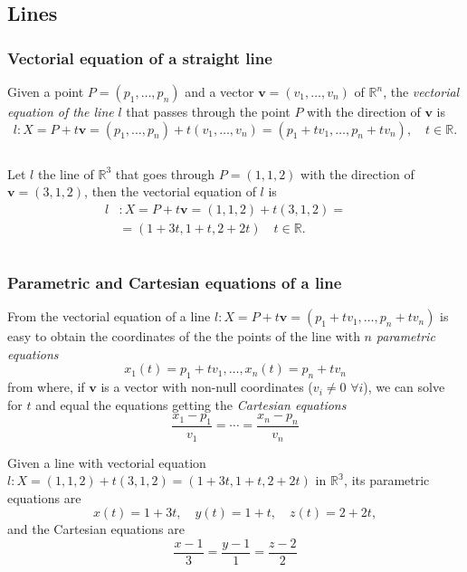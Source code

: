\subsection{Lines}
\begin{frame}
\frametitle{Vectorial equation of a straight line}
\begin{definition}
Given a point $P=(p_1,\ldots,p_n)$ and a vector $\mathbf{v}=(v_1,\ldots,v_n)$ of $\mathbb{R}^n$, the \emph{vectorial equation of the line} $l$ that passes through the point $P$ with the direction of $\mathbf{v}$ is
\[
l: X= P + t\mathbf{v} = (p_1,\ldots,p_n)+t(v_1,\ldots,v_n) = (p_1+tv_1,\ldots,p_n+tv_n),\quad t\in\mathbb{R}.
\]
\end{definition}

\begin{columns}
\begin{column}{.48\textwidth}
Let $l$ the line of $\mathbb{R}^3$ that goes through $P=(1,1,2)$ with the direction of $\mathbf{v}=(3,1,2)$, then the vectorial equation of $l$ is
\begin{align*}
l &: X= P + t\mathbf{v} = (1,1,2)+t(3,1,2) =\\
&= (1+3t,1+t,2+2t)\quad t\in\mathbb{R}.
\end{align*}
\end{column}
\begin{column}{.48\textwidth}
\begin{center}

\end{center}
\end{column}
\end{columns}
\end{frame}


\begin{frame}
\frametitle{Parametric and Cartesian equations of a line}
From the vectorial equation of a line $l: X=P + t\mathbf{v}=(p_1+tv_1,\ldots,p_n+tv_n)$ is easy to obtain the coordinates of the the points of the line with $n$ \emph{parametric equations}
\[
x_1(t)=p_1+tv_1, \ldots, x_n(t)=p_n+tv_n
\]
from where, if $\mathbf{v}$ is a vector with non-null coordinates ($v_i\neq 0$ $\forall i$), we can solve for $t$ and equal the equations getting the \emph{Cartesian equations}  
\[
\frac{x_1-p_1}{v_1}=\cdots = \frac{x_n-p_n}{v_n}
\]

Given a line with vectorial equation $l: X=(1,1,2)+t(3,1,2) =(1+3t,1+t,2+2t)$ in $\mathbb{R^3}$, its parametric equations are 
\[
x(t) = 1+3t, \quad y(t)=1+t, \quad z(t)=2+2t,
\]
and the Cartesian equations are
\[
\frac{x-1}{3}=\frac{y-1}{1}=\frac{z-2}{2}
\]
\end{frame}


